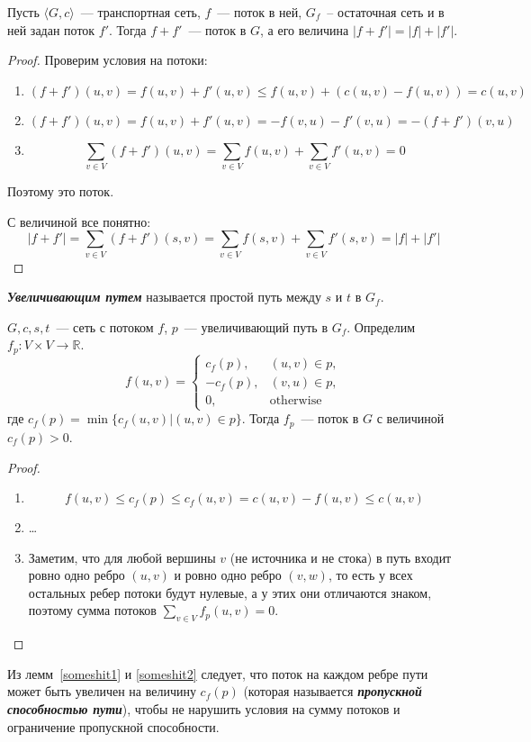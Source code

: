 \begin{lemma}\label{someshit1} %
	Пусть $\langle G,c\rangle$~--- транспортная сеть, $f$~--- поток в ней, $G_f$~-- остаточная сеть и в ней задан поток $f'$. Тогда $f+f'$~--- поток в $G$, а его величина $|f+f'|=|f|+|f'|$.
\end{lemma}
\begin{proof}
	Проверим условия на потоки:
	\begin{enumerate}
		\item $$(f+f')(u,v)=f(u,v)+f'(u,v)\le f(u,v)+(c(u,v)-f(u,v))=c(u,v)$$
		\item $$(f+f')(u,v)=f(u,v)+f'(u,v)=-f(v,u)-f'(v,u)=-(f+f')(v,u)$$
		\item $$\sum_{v\in V}(f+f')(u,v)=\sum_{v\in V}f(u,v)+\sum_{v\in V}f'(u,v)=0$$
	\end{enumerate}
	Поэтому это поток.
	
	С величиной все понятно:
	$$|f+f'|=\sum_{v\in V}(f+f')(s,v)=\sum_{v\in V}f(s,v)+\sum_{v\in V}f'(s,v)=|f|+|f'|$$
\end{proof}
\begin{definition}
	{\bf\it Увеличивающим путем} называется простой путь между $s$ и $t$ в $G_f$.
\end{definition}
\begin{lemma}\label{someshit2}
	$G,c,s,t$~--- сеть с потоком $f$, $p$~--- увеличивающий путь в $G_f$. Определим $f_p\colon V\times V\to\mathbb{R}$.
	$$
	f(u,v)=
	\begin{cases}
		c_f(p), & (u,v)\in p,\\
		-c_f(p), & (v,u)\in p,\\
		0, & \mathrm{otherwise}
	\end{cases}
	$$
	где $c_f(p)=\min\{c_f(u,v)|(u,v)\in p\}$.
	Тогда $f_p$~--- поток в $G$ с величиной $c_f(p)>0$.
\end{lemma}
\begin{proof}
	\begin{enumerate}
		\item $$f(u,v)\le c_f(p)\le c_f(u,v)=c(u,v)-f(u,v)\le c(u,v)$$
		\item \ldots
		\item Заметим, что для любой вершины $v$ (не источника и не стока) в путь входит ровно одно ребро $(u,v)$ и ровно одно ребро $(v,w)$, то есть у всех остальных ребер потоки будут нулевые, а у этих они отличаются знаком, поэтому сумма потоков  $\sum_{v\in V}f_p(u,v)=0$.
	\end{enumerate}
\end{proof}
Из лемм~\ref{someshit1} и \ref{someshit2} следует, что поток на каждом ребре пути может быть увеличен на величину $c_f(p)$ (которая называется {\bf\it пропускной способностью пути}), чтобы не нарушить условия на сумму потоков и ограничение пропускной способности.

